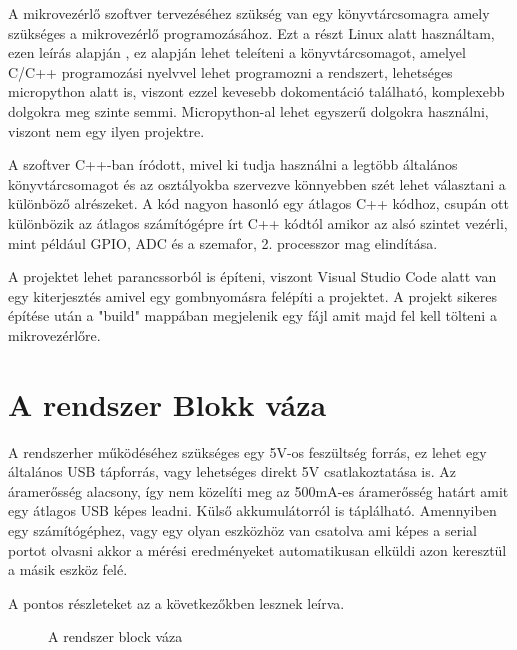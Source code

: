 A mikrovezérlő szoftver tervezéséhez szükség van egy könyvtárcsomagra amely szükséges
a mikrovezérlő programozásához. Ezt a részt Linux alatt használtam, ezen leírás alapján
\cite{PicoInstallLinux}, ez alapján lehet teleíteni a könyvtárcsomagot, amelyel C/C++ programozási
nyelvvel lehet programozni a rendszert, lehetséges micropython alatt is, viszont ezzel kevesebb
dokomentáció található, komplexebb dolgokra meg szinte semmi. Micropython-al lehet egyszerű
dolgokra használni, viszont nem egy ilyen projektre.

A szoftver C++-ban íródott, mivel ki tudja használni a legtöbb általános könyvtárcsomagot
és az osztályokba szervezve könnyebben szét lehet választani a különböző alrészeket. A kód 
nagyon hasonló egy átlagos C++ kódhoz, csupán ott különbözik az átlagos számítógépre írt C++ kódtól 
amikor az alsó szintet vezérli, mint például GPIO, ADC és a szemafor, 2. processzor mag elindítása.

A projektet lehet parancssorból is építeni, viszont Visual Studio Code alatt van egy kiterjesztés
amivel egy gombnyomásra felépíti a projektet. A projekt sikeres építése után a "build" mappában megjelenik
egy fájl amit majd fel kell tölteni a mikrovezérlőre.

\section{A rendszer Blokk váza}

A rendszerher működéséhez szükséges egy 5V-os feszültség forrás, ez lehet egy általános USB
tápforrás, vagy lehetséges direkt 5V csatlakoztatása is. Az áramerősség alacsony, így nem közelíti
meg az 500mA-es áramerősség határt amit egy átlagos USB képes leadni. Külső akkumulátorról
is táplálható. Amennyiben egy számítógéphez, vagy egy olyan eszközhöz van csatolva ami képes 
a serial portot olvasni akkor a mérési eredményeket automatikusan elküldi azon keresztül a 
másik eszköz felé. 

A pontos részleteket az a következőkben lesznek leírva.

\begin{figure}[H]
    \centering
    \caption{A rendszer block váza}
    \label{fig:blockDiagramm}
\end{figure}


